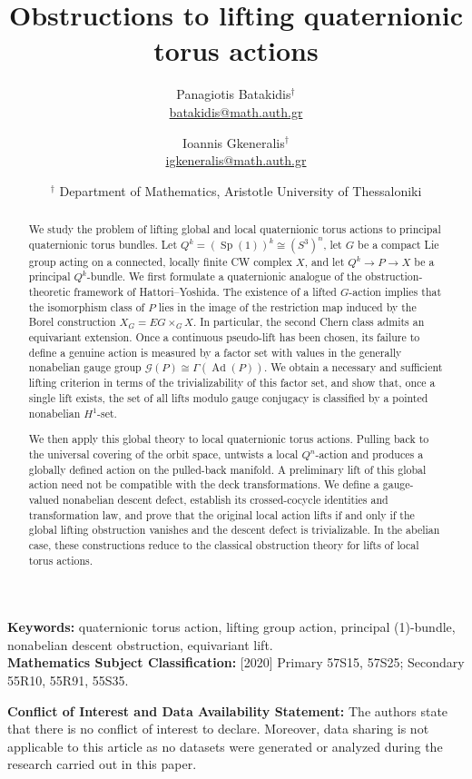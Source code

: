 \documentclass[11pt,a4paper]{article}
\title{Obstructions to lifting quaternionic torus actions}
\author{Panagiotis Batakidis$^\dagger$ \\\href{mailto:batakidis@math.auth.gr}{batakidis@math.auth.gr}  \and Ioannis Gkeneralis$^\dagger$
\\\href{mailto:igkeneralis@math.auth.gr}{igkeneralis@math.auth.gr}}
\date{$^\dagger$ Department of Mathematics, Aristotle University of Thessaloniki}
\numberwithin{equation}{section}
\theoremstyle{named}
\newcommand{\keywords}[1]{\textbf{Keywords: } #1}
\newcommand{\msc}[1]{\textbf{Mathematics Subject Classification: } #1}
\begin{document}
\maketitle

\begin{abstract}
We study the problem of lifting global and local quaternionic torus actions to principal quaternionic torus bundles. Let \(Q^k=(\operatorname{Sp}(1))^k\cong (S^3)^n\), let \(G\) be a compact Lie group acting on a connected, locally finite CW complex \(X\), and let \(Q^k\longrightarrow P\longrightarrow X\) be a principal \(Q^k\)-bundle. We first formulate a quaternionic analogue of the obstruction-theoretic framework of Hattori--Yoshida. The existence of a lifted \(G\)-action implies that the isomorphism class of \(P\) lies in the image of the restriction map induced by the Borel construction \(X_G=EG\times_GX\). In particular, the second Chern class admits an equivariant extension. Once a continuous pseudo-lift has been chosen, its failure to define a genuine action is measured by a factor set with values in the generally nonabelian gauge group \(\mathcal G(P)\cong\Gamma(\operatorname{Ad}(P))\). We obtain a necessary and sufficient lifting criterion in terms of the trivializability of this factor set, and show that, once a single lift exists, the set of all lifts modulo gauge conjugacy is classified by a pointed nonabelian \(H^1\)-set.

We then apply this global theory to local quaternionic torus actions. Pulling back to the universal covering of the orbit space, untwists a local \(Q^n\)-action and produces a globally defined action on the pulled-back manifold. A preliminary lift of this global action need not be compatible with the deck transformations. We define a gauge-valued nonabelian descent defect, establish its crossed-cocycle identities and transformation law, and prove that the original local action lifts if and only if the global lifting obstruction vanishes and the descent defect is trivializable. In the abelian case, these constructions reduce to the classical obstruction theory for lifts of local torus actions.
\end{abstract}


\noindent \keywords{quaternionic torus action, lifting group action, principal \text{Sp}(1)-bundle, nonabelian descent obstruction, equivariant lift.} \\[1ex]
\msc[2020] {Primary 57S15, 57S25; Secondary 55R10, 55R91, 55S35.}

\vspace{0.5ex}
\noindent \textbf{Conflict of Interest and Data Availability Statement:} The authors state that there is no conflict of interest to declare. Moreover, data sharing is not applicable to this article as no datasets were generated or analyzed during the research carried out in this paper.
\end{document}
